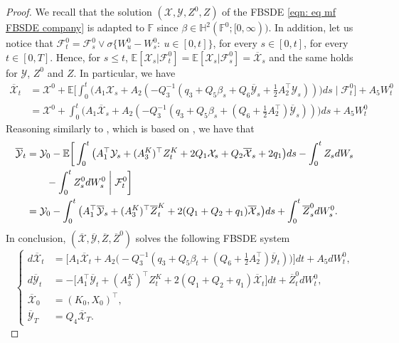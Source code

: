 \documentclass[11pt,twoside]{amsart}
\theoremstyle{definition}
\numberwithin{equation}{section}
\newcommand{\E}{\mathbb{E}}
\newcommand{\F}{\mathbb{F}}
\newcommand{\ItF}{\mathcal{F}}
\renewcommand{\bar}{\overline}
\begin{document}
\begin{proof}
We recall that the solution $(\mathcal{X},\mathcal{Y},Z^0,Z)$ of the FBSDE \eqref{eqn: eq mf FBSDE company} is adapted to $\F$ since $\beta\in \mathbb{H}^2(\F^0;[0,\infty))$. In addition, let us notice that $\ItF^0_t = \ItF^0_s \vee \sigma\{W^0_u - W^0_s:\ u\in[0,t]\}$, for every $s\in[0,t]$, for every $t\in [0,T]$. Hence, for $s\leq t$, $\E[ \mathcal{X}_s|\ItF^0_t] = \E[ \mathcal{X}_s|\ItF^0_s] = \bar{\mathcal{X}}_s$ and the same holds for $\mathcal{Y}$, $Z^0$ and $Z$. In particular, we have
\begin{align*}
    \bar{\mathcal{X}}_t &= \mathcal{X}^0+ \E\bigg[\int_0^t \big( A_1 \mathcal{X}_s + A_2( -Q_3^{-1} ( q_3  + Q_5\beta_s+ Q_6\overline{\mathcal{Y}}_s+\frac{1}{2} A_2^\top \mathcal{Y}_s)) \big) ds \mid \ItF^0_t\bigg]+ A_5W^0_t\\
        &=  \mathcal{X}^0 + \int_0^t \big( A_1 \bar{\mathcal{X}}_s + A_2( -Q_3^{-1} ( q_3  + Q_5\beta_s+ (Q_6+\frac{1}{2}A_2^\top) \bar{\mathcal{Y}}_s)) \big) ds+ A_5W^0_t
\end{align*}
Reasoning similarly to \cite[Theorem 2.2]{wang2018introduction}, which is based on \cite[Theorem 8.1]{liptser2013statistics}, we have that
\begin{align*}
\bar{\mathcal{Y}}_t &=\mathcal{Y}_0 -\E\bigg[\int_0^t\big( A_1^\top \mathcal{Y}_s + (A^K_3)^\top Z^{K}_t + 2Q_1\mathcal{X}_s + Q_2\overline{\mathcal{X}}_s + 2q_1\big) ds - \int_0^tZ_s dW_s\\
&\qquad - \int_0^tZ^{0}_s dW^0_s\biggm| \ItF^0_t\bigg]\\
&= \mathcal{Y}_0- \int_0^t\big( A_1^\top \bar{\mathcal{Y}}_s + (A^K_3)^\top \bar{Z}^{K}_t + 2(Q_1+Q_2+q_1)\bar{\mathcal{X}}_s \big) ds + \int_0^t\bar{Z}^0_s dW^0_s.
\end{align*}
In conclusion, $(\bar{\mathcal{X}}, \bar{\mathcal{Y}}, \bar{Z}, \bar{Z}^0)$ solves the following FBSDE system 
\begin{equation}
\label{eqn: eq mf FBSDE company projected} 
\begin{cases}
    d\bar{\mathcal{X}}_t&=   \big[ A_1 \bar{\mathcal{X}}_t + A_2\big( -Q_3^{-1} ( q_3  + Q_5\beta_t+( Q_6 +\frac{1}{2} A_2^\top)\overline{\mathcal{Y}}_t)\big)\big] dt  + A_5dW^0_t,\\
    d\bar{\mathcal{Y}}_t &= - \big[A^\top_1 \bar{\mathcal{Y}}_t+ (A^K_3)^\top Z^{K}_t + 2(Q_1 + Q_2 +q_1) \bar{\mathcal{X}}_t \big] dt+ \bar{Z}^0_t dW^0_t, \\
\bar{\mathcal{X}}_0 &= (K_0,X_0)^\top,\\
\bar{\mathcal{Y}}_T &= Q_4\bar{\mathcal{X}}_T.
\end{cases}
\end{equation}


\end{proof}
\end{document}
